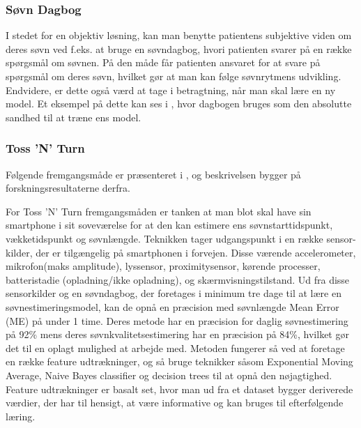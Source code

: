\subsubsection{Søvn Dagbog}
I stedet for en objektiv løsning, kan man benytte patientens subjektive viden om deres søvn ved f.eks. at bruge en søvndagbog, hvori patienten svarer på en række spørgsmål om søvnen. 
På den måde får patienten ansvaret for at svare på spørgsmål om deres søvn, hvilket gør at man kan følge søvnrytmens udvikling.
Endvidere, er dette også værd at tage i betragtning, når man skal lære en ny model. 
Et eksempel på dette kan ses i \citet{Min:2014:TNT:2556288.2557220}, hvor dagbogen bruges som den absolutte sandhed til at træne ens model.
\begin{comment}
Med ressourcerne for dette projekt er dette dog ikke valgt som primær fokus, da vi ønsker en metode der kan estimere søvn med mindst mulig bruger intervention, og hvor grundlaget for vurdering skal være ved hjælp af sensorer fremfor en subjektiv vurdering man alligevel har mulighed for i forvejen.
Idéen om en "objektiv dagbog" er dermed også i tankerne her, og er hvorfor denne løsning ikke undersøges nærmere end at det kan bruges for læringsperioder for vores modeller.
\end{comment}

\subsubsection{Toss 'N' Turn}\label{sec:tossNturn}
Følgende fremgangsmåde er præsenteret i \citet{Min:2014:TNT:2556288.2557220}, og beskrivelsen bygger på forskningsresultaterne derfra.

For Toss 'N' Turn fremgangsmåden er tanken at man blot skal have sin smartphone i sit soveværelse for at den kan estimere ens søvnstarttidspunkt, vækketidspunkt og søvnlængde.
Teknikken tager udgangspunkt i en række sensor-kilder, der er tilgængelig på smartphonen i forvejen.
Disse værende accelerometer, mikrofon(maks amplitude), lyssensor, proximitysensor, kørende processer, batteristadie (opladning/ikke opladning), og skærmvisningstilstand.
Ud fra disse sensorkilder og en søvndagbog, der foretages i minimum tre dage til at lære en søvnestimeringsmodel, kan de opnå en præcision med søvnlængde Mean Error (ME) på under 1 time.
Deres metode har en præcision for daglig søvnestimering på 92\% mens deres søvnkvalitetsestimering har en præcision på 84\%, hvilket gør det til en oplagt mulighed at arbejde med.
Metoden fungerer så ved at foretage en række feature udtrækninger, og så bruge teknikker såsom Exponential Moving Average, Naive Bayes classifier og decision trees til at opnå den nøjagtighed.
Feature udtrækninger er basalt set, hvor man ud fra et dataset bygger deriverede værdier, der har til hensigt, at være informative og kan bruges til efterfølgende læring.

